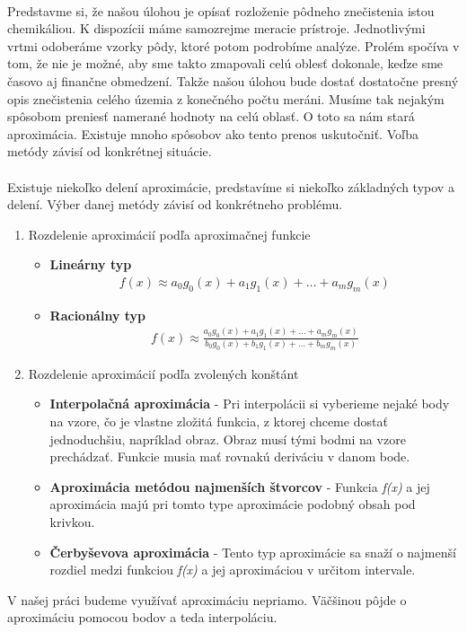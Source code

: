 \documentclass[12pt]{article}
\begin{document}
\paragraph{}
Predstavme si, že našou úlohou je opísať rozloženie pôdneho znečistenia istou chemikáliou. K dispozícii máme samozrejme meracie prístroje. Jednotlivými vrtmi odoberáme vzorky pôdy, ktoré potom podrobíme analýze.
Prolém spočíva v tom, že nie je možné, aby sme takto zmapovali celú oblesť dokonale, keďze sme časovo aj finančne obmedzení. Takže našou úlohou bude dostať dostatočne presný opis znečistenia celého územia z konečného počtu meráni.
Musíme tak nejakým spôsobom preniesť namerané hodnoty na celú oblasť. O toto sa nám stará aproximácia. Existuje mnoho spôsobov ako tento prenos uskutočniť. Voľba metódy závisí od konkrétnej situácie.
\cite{num_metody}
\paragraph{}
Existuje niekoľko delení aproximácie, predstavíme si niekoľko základných typov a delení. Výber danej metódy závisí od konkrétneho problému.
\begin{enumerate}
  \item Rozdelenie aproximácií podľa aproximačnej funkcie
	\begin{itemize}
	  \item \textbf{Lineárny typ}
		\begin{align*}
		f(x) \approx a_0 g_0(x) + a_1 g_1(x) + \ldots + a_m g_m(x)
		\end{align*}
	  \item \textbf{Racionálny typ}
	  	\begin{align*}
		f(x) \approx \frac{a_0 g_0(x) + a_1 g_1(x) + \ldots + a_m g_m(x)}{b_0 g_0(x) + b_1 g_1(x) + \ldots + b_m g_m(x)}
		\end{align*}
	\end{itemize}
  \item Rozdelenie aproximácií podľa zvolených konštánt
  	\begin{itemize}
	  \item 
	  	\textbf{Interpolačná aproximácia} - Pri interpolácii si vyberieme nejaké body na vzore, čo je vlastne zložitá funkcia, z ktorej chceme dostať jednoduchšiu, napríklad obraz.
	  	Obraz musí tými bodmi na vzore prechádzať. Funkcie musia mať rovnakú deriváciu v danom bode.
	  \item 
	  	\textbf{Aproximácia metódou najmenších štvorcov} - Funkcia \emph{f(x)} a jej aproximácia majú pri tomto type aproximácie podobný obsah pod krivkou.
	  \item 
	  	\textbf{Čerbyševova aproximácia} - Tento typ aproximácie sa snaží o najmenší rozdiel medzi funkciou \emph{f(x)} a jej aproximáciou v určitom intervale.
	\end{itemize}
\end{enumerate}
V našej práci budeme využívať aproximáciu nepriamo. Väčšinou pôjde o aproximáciu pomocou bodov a teda interpoláciu.
\cite{aproximacia}
\end{document}
